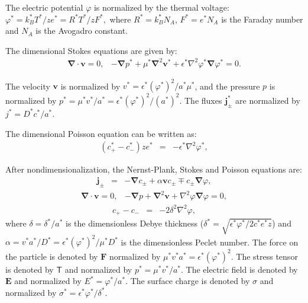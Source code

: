 \documentclass[10pt]{ijnam}
\newcommand\eps \epsilon
\newcommand\Laplacian{\nabla^2}
\newcommand\bnabla{\boldsymbol{\nabla}}
\newcommand\bLaplacian{\boldsymbol{\nabla}^2}
\newcommand\bv{\boldsymbol{v}}
\newcommand\bE{\boldsymbol{E}}
\newcommand\bj{\boldsymbol{j}}
\newcommand\bF{\boldsymbol{F}}
\newcommand\tT{\mathsf{T}}
\begin{document}
The electric potential $\varphi$ is normalized by the thermal voltage:
$\varphi^* = {k_B^* T^*}/{z e^*} = {R^* T^*}/{z F^*},$
where $R^* = k_B^* N_A$, $F^* = e^* N_A$ is the Faraday number and $N_A$ is the Avogadro constant.

The dimensional Stokes equations are given by:
\begin{eqnarray}
\bnabla \cdot \bv = 0, &
-\bnabla p^* + \mu^* \bLaplacian \bv^* + \eps^* \Laplacian \varphi^* \bnabla \varphi^* = 0.
\end{eqnarray}

The velocity $\bv$ is normalized by $v^* = {\eps^* (\varphi^*)^2}/{a^* \mu^*}$,
and the pressure $p$ is normalized by $p^* = {\mu^* v^*}/{a^*} = {\eps^* (\varphi^*)^2}/{(a^*)^2}$.
The fluxes $\bj^*_\pm$ are normalized by $j^* = {D^* c^*}/{a^*}$.

The dimensional Poisson equation can be written as:
\begin{eqnarray}
(c^*_+ - c^*_-) z e^* &=& -\eps^* \Laplacian \varphi^*,
\end{eqnarray}

After nondimensionalization, the Nernst-Plank, Stokes and Poisson equations are:
\begin{eqnarray} \label{eq:nernst}
\bj_\pm &=& 
-\bnabla c_\pm + \alpha \bv c_\pm \mp c_\pm \bnabla \varphi,
\end{eqnarray}
\begin{eqnarray} \label{eq:stokes}
\bnabla \cdot \bv = 0, & -\bnabla p + \bLaplacian \bv + \Laplacian \varphi \bnabla \varphi = 0, 
\end{eqnarray}
\begin{eqnarray} \label{poisson}
c_+ - c_- &=& -2\delta^2 \Laplacian \varphi,
\end{eqnarray}
where $\delta = {\delta^*}/{a^*}$ is the dimensionless Debye thickness 
($\delta^* = \sqrt{{\eps^* \varphi^*}/{2 c^* e^* z}}$) and 
$\alpha = {v^* a^*}/{D^*} = {\eps^* (\varphi^*)^2}/{\mu^* D^*}$ 
is the dimensionless Peclet number.
The force on the particle is denoted by $\bF$ normalized by $\mu^* v^* a^* = \eps^* (\varphi^*)^2$.
The stress tensor is denoted by $\tT$ and normalized by $p^* = \mu^* v^* / a^*$.
The electric field is denoted by $\bE$ and normalized by $E^* = \varphi^* / a^*$.
The surface charge is denoted by $\sigma$ and normalized by $\sigma^* = \eps^* \varphi^* / \delta^*$.
\end{document}
